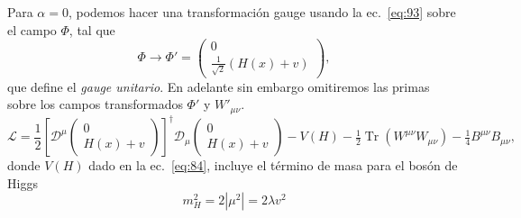 Para $\alpha=0$, podemos hacer una transformaci\'on gauge usando la ec.~\eqref{eq:93} sobre el campo $\Phi$, tal que
\begin{equation}
  \label{eq:123}
    \Phi\to\Phi'=
  \begin{pmatrix}
    0\\
    \frac{1}{\sqrt{2}}(H(x)+v)
  \end{pmatrix},
\end{equation}
que define el \emph{gauge unitario}. En adelante sin embargo omitiremos las primas sobre los campos transformados $\Phi'$ y $W'_{\mu\nu}$.
\begin{equation}
  \mathcal{L}=\frac{1}{2}\left[\mathcal{D}^\mu \begin{pmatrix}
    0\\
    H(x)+v
  \end{pmatrix}\right]^\dagger\mathcal{D}_\mu\begin{pmatrix}
    0\\
    H(x)+v
  \end{pmatrix}-V(H)-\tfrac{1}{2}\operatorname{Tr}\left(W^{\mu\nu}W_{\mu\nu}\right)-\tfrac{1}{4}B^{\mu\nu}B_{\mu\nu},
\end{equation}
donde $V(H)$ dado en la ec.~\eqref{eq:84}, incluye el t\'ermino de masa para el bos\'on de Higgs
\begin{equation}
  m_H^2=2\left|\mu^2\right|=2\lambda v^2
\end{equation}
